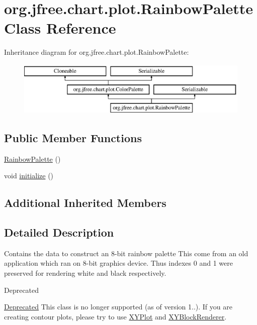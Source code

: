 \hypertarget{classorg_1_1jfree_1_1chart_1_1plot_1_1_rainbow_palette}{}\section{org.\+jfree.\+chart.\+plot.\+Rainbow\+Palette Class Reference}
\label{classorg_1_1jfree_1_1chart_1_1plot_1_1_rainbow_palette}
Inheritance diagram for org.\+jfree.\+chart.\+plot.\+Rainbow\+Palette\+:\begin{figure}[H]
\begin{center}
\leavevmode
\includegraphics[height=2.592592cm]{classorg_1_1jfree_1_1chart_1_1plot_1_1_rainbow_palette}
\end{center}
\end{figure}
\subsection*{Public Member Functions}
\begin{DoxyCompactItemize}
\item 
\mbox{\hyperlink{classorg_1_1jfree_1_1chart_1_1plot_1_1_rainbow_palette_a9d1fbb955d394cee115eaa67d7554b38}{Rainbow\+Palette}} ()
\item 
void \mbox{\hyperlink{classorg_1_1jfree_1_1chart_1_1plot_1_1_rainbow_palette_a1e9eb5dd27d089c858037073eb0ec1ae}{initialize}} ()
\end{DoxyCompactItemize}
\subsection*{Additional Inherited Members}


\subsection{Detailed Description}
Contains the data to construct an 8-\/bit rainbow palette This come from an old application which ran on 8-\/bit graphics device. Thus indexes 0 and 1 were preserved for rendering white and black respectively.

\begin{DoxyRefDesc}{Deprecated}
\item[\mbox{\hyperlink{deprecated__deprecated000084}{Deprecated}}]This class is no longer supported (as of version 1..). If you are creating contour plots, please try to use \mbox{\hyperlink{classorg_1_1jfree_1_1chart_1_1plot_1_1_x_y_plot}{X\+Y\+Plot}} and \mbox{\hyperlink{}{X\+Y\+Block\+Renderer}}. \end{DoxyRefDesc}


